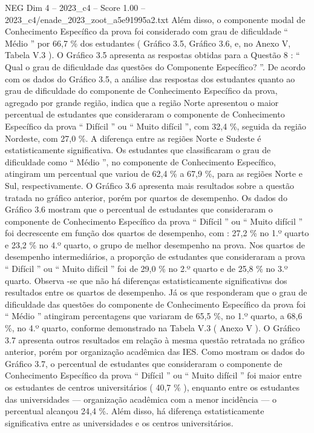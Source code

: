 \begin{textsample}{NEG Dim 4 – 2023\_c4 – Score 1.00 – 2023\_c4/enade\_2023\_zoot\_a5e91995a2.txt}
Além disso, o componente modal de Conhecimento Específico da prova foi considerado com grau de dificuldade “ Médio ” por 66,7 \% dos estudantes ( Gráfico 3.5, Gráfico 3.6, e, no Anexo V, Tabela V.3 ).
O Gráfico 3.5 apresenta as respostas obtidas para a Questão 8 : “ Qual o grau de dificuldade das questões do Componente Específico? ”.
De acordo com os dados do Gráfico 3.5, a análise das respostas dos estudantes quanto ao grau de dificuldade do componente de Conhecimento Específico da prova, agregado por grande região, indica que a região Norte apresentou o maior percentual de estudantes que consideraram o componente de Conhecimento Específico da prova “ Difícil ” ou “ Muito difícil ”, com 32,4 \%, seguida da região Nordeste, com 27,0 \%.
A diferença entre as regiões Norte e Sudeste é estatisticamente significativa.
Os estudantes que classificaram o grau de dificuldade como “ Médio ”, no componente de Conhecimento Específico, atingiram um percentual que variou de 62,4 \% a 67,9 \%, para as regiões Norte e Sul, respectivamente.
O Gráfico 3.6 apresenta mais resultados sobre a questão tratada no gráfico anterior, porém por quartos de desempenho.
Os dados do Gráfico 3.6 mostram que o percentual de estudantes que consideraram o componente de Conhecimento Específico da prova “ Difícil ” ou “ Muito difícil ” foi decrescente em função dos quartos de desempenho, com : 27,2 \% no 1.º quarto e 23,2 \% no 4.º quarto, o grupo de melhor desempenho na prova.
Nos quartos de desempenho intermediários, a proporção de estudantes que consideraram a prova “ Difícil ” ou “ Muito difícil ” foi de 29,0 \% no 2.º quarto e de 25,8 \% no 3.º quarto.
Observa -se que não há diferenças estatisticamente significativas dos resultados entre os quartos de desempenho.
Já os que responderam que o grau de dificuldade das questões do componente de Conhecimento Específico da prova foi “ Médio ” atingiram percentagens que variaram de 65,5 \%, no 1.º quarto, a 68,6 \%, no 4.º quarto, conforme demonstrado na Tabela V.3 ( Anexo V ).
O Gráfico 3.7 apresenta outros resultados em relação à mesma questão retratada no gráfico anterior, porém por organização acadêmica das IES.
Como mostram os dados do Gráfico 3.7, o percentual de estudantes que consideraram o componente de Conhecimento Específico da prova “ Difícil ” ou “ Muito difícil ” foi maior entre os estudantes de centros universitários ( 40,7 \% ), enquanto entre os estudantes das universidades — organização acadêmica com a menor incidência — o percentual alcançou 24,4 \%.
Além disso, há diferença estatisticamente significativa entre as universidades e os centros universitários.

\end{textsample}
